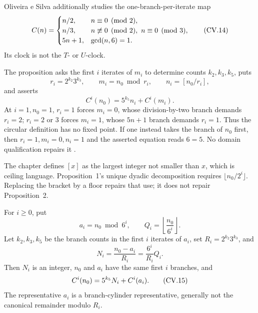 Oliveira e Silva additionally studies the one-branch-per-iterate map
\begin{equation}
\stepcounter{equation}
\label{eq:Oliveira-generalized-five}
 C(n)=
 \begin{cases}
  n/2,&n\equiv0\pmod2,\\
  n/3,&n\not\equiv0\pmod2,\ n\equiv0\pmod3,\\
  5n+1,&\gcd(n,6)=1.
 \end{cases}
\tag{CV.14}
\end{equation}
Its clock is not the $T$- or $U$-clock.

\begin{sourceissue}
\label{sourceissue:Oliveira-proposition-two}
The proposition asks the first $i$ iterates of $m_i$ to determine counts
$k_2,k_3,k_5$, puts
\[
 r_i=2^{k_2}3^{k_3},\qquad
 m_i=n_0\bmod r_i,\qquad n_i=[n_0/r_i],
\]
and asserts
\[
 C^i(n_0)=5^{k_5}n_i+C^i(m_i).
\]
At $i=1,n_0=1$, $r_i=1$ forces $m_i=0$, whose division-by-two branch demands
$r_i=2$; $r_i=2$ or $3$ forces $m_i=1$, whose $5n+1$ branch demands
$r_i=1$.  Thus the circular definition has no fixed point.  If one instead
takes the branch of $n_0$ first, then $r_i=1,m_i=0,n_i=1$ and the asserted
equation reads $6=5$.  No domain qualification repairs it
\cite[p.~200]{OliveiraSilva2010}.

The chapter defines $[x]$ as the largest integer not smaller than $x$, which
is ceiling language.  Proposition~1's unique dyadic decomposition requires
$\lfloor n_0/2^i\rfloor$.  Replacing the bracket by a floor repairs that use;
it does not repair Proposition~2.
\end{sourceissue}

\begin{proposition}
\label{prop:Oliveira-branch-cylinder}
For $i\geq0$, put
\[
 a_i=n_0\bmod6^i,\qquad
 Q_i=\left\lfloor\frac{n_0}{6^i}\right\rfloor.
\]
Let $k_2,k_3,k_5$ be the branch counts in the first $i$ iterates of $a_i$,
set $R_i=2^{k_2}3^{k_3}$, and
\[
 N_i=\frac{n_0-a_i}{R_i}=\frac{6^i}{R_i}Q_i.
\]
Then $N_i$ is an integer, $n_0$ and $a_i$ have the same first $i$ branches,
and
\begin{equation}
\stepcounter{equation}
\label{eq:Oliveira-branch-cylinder}
 C^i(n_0)=5^{k_5}N_i+C^i(a_i).
\tag{CV.15}
\end{equation}
The representative $a_i$ is a branch-cylinder representative, generally not
the canonical remainder modulo $R_i$.
\end{proposition}

